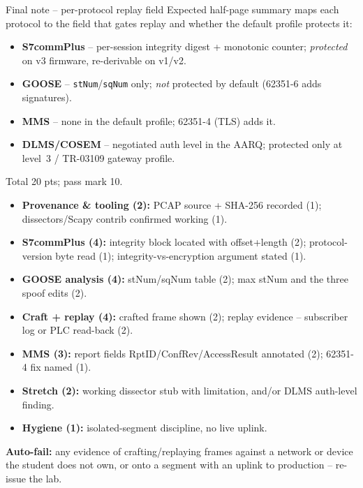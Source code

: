 \documentclass[11pt,a4paper]{article}
\begin{document}
\begin{solutionbox}{Final note -- per-protocol replay field}
Expected half-page summary maps each protocol to the field that gates
replay and whether the default profile protects it:
\begin{itemize}\setlength{\itemsep}{1pt}
  \item \textbf{S7commPlus} -- per-session integrity digest + monotonic
        counter; \emph{protected} on v3 firmware, re-derivable on v1/v2.
  \item \textbf{GOOSE} -- \texttt{stNum}/\texttt{sqNum} only; \emph{not}
        protected by default (62351-6 adds signatures).
  \item \textbf{MMS} -- none in the default profile; 62351-4 (TLS) adds it.
  \item \textbf{DLMS/COSEM} -- negotiated auth level in the AARQ;
        protected only at level~3 / TR-03109 gateway profile.
\end{itemize}
\end{solutionbox}

\begin{rubricbox}
Total 20 pts; pass mark 10.
\begin{itemize}\setlength{\itemsep}{1pt}
  \item \textbf{Provenance \& tooling (2):} PCAP source + SHA-256 recorded
        (1); dissectors/Scapy contrib confirmed working (1).
  \item \textbf{S7commPlus (4):} integrity block located with offset+length
        (2); protocol-version byte read (1); integrity-vs-encryption
        argument stated (1).
  \item \textbf{GOOSE analysis (4):} stNum/sqNum table (2); max stNum and
        the three spoof edits (2).
  \item \textbf{Craft + replay (4):} crafted frame shown (2); replay
        evidence -- subscriber log or PLC read-back (2).
  \item \textbf{MMS (3):} report fields RptID/ConfRev/AccessResult
        annotated (2); 62351-4 fix named (1).
  \item \textbf{Stretch (2):} working dissector stub with limitation, and/or
        DLMS auth-level finding.
  \item \textbf{Hygiene (1):} isolated-segment discipline, no live uplink.
\end{itemize}
\textbf{Auto-fail:} any evidence of crafting/replaying frames against a
network or device the student does not own, or onto a segment with an
uplink to production -- re-issue the lab.
\end{rubricbox}
\end{document}

